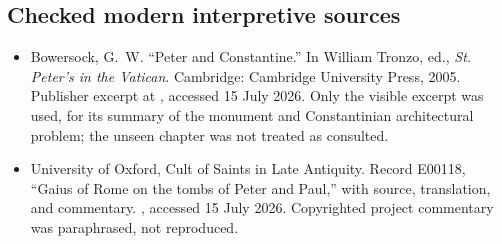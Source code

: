 \subsection{Checked modern interpretive sources}

\begin{itemize}
\item Bowersock, G.~W. ``Peter and Constantine.'' In William Tronzo, ed.,
  \emph{St. Peter's in the Vatican}. Cambridge: Cambridge University Press,
  2005. Publisher excerpt at
  ,
  accessed 15 July 2026. Only the visible excerpt was used, for its summary of
  the monument and Constantinian architectural problem; the unseen chapter was
  not treated as consulted.

\item University of Oxford, Cult of Saints in Late Antiquity. Record E00118,
  ``Gaius of Rome on the tombs of Peter and Paul,'' with source, translation,
  and commentary.
  ,
  accessed 15 July 2026. Copyrighted project commentary was paraphrased, not
  reproduced.
\end{itemize}
